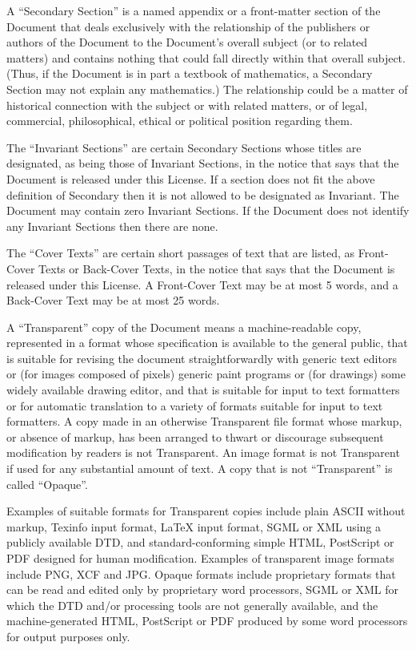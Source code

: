 A “Secondary Section” is a named appendix or a
front-matter section of the Document that deals exclusively
with the relationship of the publishers or authors of the
Document to the Document’s overall subject (or to related
matters) and contains nothing that could fall directly
within that overall subject. (Thus, if the Document is in
part a textbook of mathematics, a Secondary Section may not
explain any mathematics.) The relationship could be a matter
of historical connection with the subject or with related
matters, or of legal, commercial, philosophical, ethical or
political position regarding them.

The “Invariant Sections” are certain Secondary Sections
whose titles are designated, as being those of Invariant
Sections, in the notice that says that the Document is
released under this License. If a section does not fit the
above definition of Secondary then it is not allowed to
be designated as Invariant. The Document may contain zero
Invariant Sections. If the Document does not identify any
Invariant Sections then there are none.

The “Cover Texts” are certain short passages of text
that are listed, as Front-Cover Texts or Back-Cover Texts,
in the notice that says that the Document is released under
this License. A Front-Cover Text may be at most 5 words,
and a Back-Cover Text may be at most 25 words.

A “Transparent” copy of the Document means a
machine-readable copy, represented in a format whose
specification is available to the general public, that is
suitable for revising the document straightforwardly with
generic text editors or (for images composed of pixels)
generic paint programs or (for drawings) some widely
available drawing editor, and that is suitable for input to
text formatters or for automatic translation to a variety of
formats suitable for input to text formatters. A copy made in
an otherwise Transparent file format whose markup, or absence
of markup, has been arranged to thwart or discourage subsequent
modification by readers is not Transparent. An image format is
not Transparent if used for any substantial amount of text. A
copy that is not “Transparent” is called “Opaque”.

Examples of suitable formats for Transparent copies include
plain ASCII without markup, Texinfo input format, LaTeX
input format, SGML or XML using a publicly available DTD, and
standard-conforming simple HTML, PostScript or PDF designed
for human modification. Examples of transparent image formats
include PNG, XCF and JPG. Opaque formats include proprietary
formats that can be read and edited only by proprietary word
processors, SGML or XML for which the DTD and/or processing
tools are not generally available, and the machine-generated
HTML, PostScript or PDF produced by some word processors for
output purposes only.

